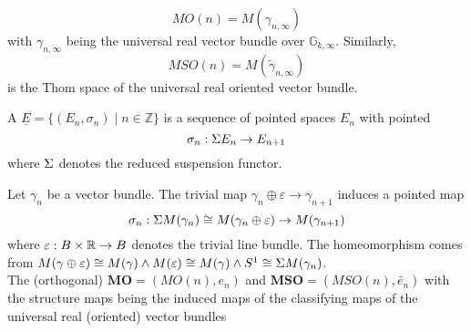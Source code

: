 \documentclass[a4paper,11pt]{article}
\begin{document}
\begin{example}
    \[MO(n)=M(\gamma_{n,\infty})\] with \(\gamma_{n,\infty}\) being the universal real vector bundle over \(\mathbb{G}_{k,\infty}\). Similarly,
    \[MSO(n)= M(\tilde\gamma_{n,\infty}) \]
    is the Thom space of the universal real oriented vector bundle.
\end{example}

\begin{definition}
    A  \(\underline E = \{(E_n,\sigma_n)\mid n\in\mathbb{Z}\}\) is a sequence of pointed spaces \(E_n\) with pointed \[\sigma_n:\Sigma E_n\to E_{n+1}\]
    where \(\Sigma\) denotes the reduced suspension functor.
\end{definition}

\begin{example}
    
\end{example}

\begin{example}[Thom spectrum\ {\cite[Beispiel IV.1.2(b)]{brocker}}]
    Let \(\gamma_n\) be a vector bundle. The trivial map \(\gamma_n\oplus\varepsilon\to\gamma_{n+1}\) induces a pointed map
    \[\sigma_n:\Sigma M(\gamma_n)\cong M(\gamma_n\oplus \varepsilon)\to M(\gamma_{n+1})\]
    where \(\varepsilon:B\times\mathbb{R}\to B\) denotes the trivial line bundle. The homeomorphism comes from \(M(\gamma\oplus\varepsilon)\cong M(\gamma)\land M(\varepsilon)\cong M(\gamma)\land S^1\cong \Sigma M(\gamma_n)\).\\
    The (orthogonal)  \(\mathbf{MO}=(MO(n),e_n)\) and \(\mathbf{MSO}=(MSO(n),\widetilde{e_n})\) with the structure maps being the induced maps of the classifying maps of the universal real (oriented) vector bundles
\end{example}


\end{document}
